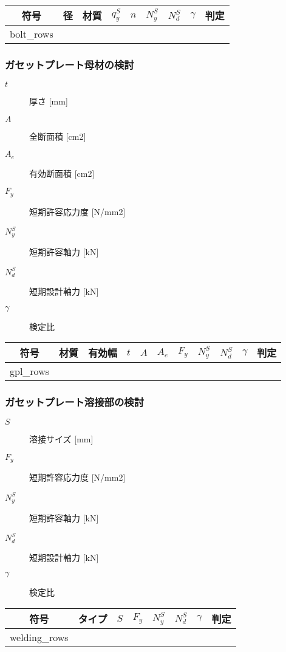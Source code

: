 \documentclass[a4paper,xelatex,ja=standard]{bxjsarticle}
\begin{document}
\begin{table}[htbp]
    \begin{tabular}{ccccccccc}
    \toprule
        符号 & 径 & 材質 & $q_y^S$ & $n$ & $N_y^S$ & $N_d^S$ & $\gamma$ & 判定 \\ \midrule
        {{bolt_rows}}
        \bottomrule
    \end{tabular}
\end{table}

\FloatBarrier

\subsubsection*{ガセットプレート母材の検討}

\begin{description}
    \item[$t$] 厚さ [mm]
    \item[$A$] 全断面積 [cm2]
    \item[$A_e$] 有効断面積 [cm2]
    \item[$F_y$] 短期許容応力度 [N/mm2]
    \item[$N_y^S$] 短期許容軸力 [kN]
    \item[$N_d^S$] 短期設計軸力 [kN]
    \item[$\gamma$] 検定比
\end{description}

\begin{table}[htbp]
    \begin{tabular}{ccccccccccc}
    \toprule
        符号 & 材質 & 有効幅 & $t$ & $A$ & $A_e$ & $F_y$ & $N_y^S$ & $N_d^S$ & $\gamma$ & 判定 \\ \midrule
        {{gpl_rows}}
        \bottomrule
    \end{tabular}
\end{table}

\FloatBarrier

\subsubsection*{ガセットプレート溶接部の検討}

\begin{description}
    \item[$S$] 溶接サイズ [mm]
    \item[$F_y$] 短期許容応力度 [N/mm2]
    \item[$N_y^S$] 短期許容軸力 [kN]
    \item[$N_d^S$] 短期設計軸力 [kN]
    \item[$\gamma$] 検定比
\end{description}

\begin{table}[htbp]
    \begin{tabular}{cccccccc}
    \toprule
        符号 & タイプ & $S$ & $F_y$ & $N_y^S$ & $N_d^S$ & $\gamma$ & 判定 \\ \midrule
        {{welding_rows}}
        \bottomrule
    \end{tabular}
\end{table}
\end{document}

